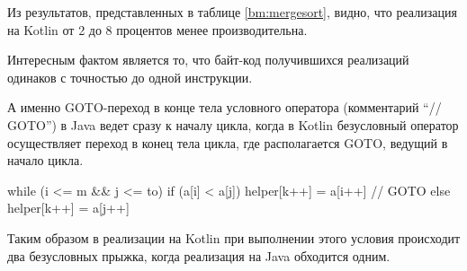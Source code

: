 Из результатов, представленных в таблице \ref{bm:mergesort}, видно, что реализация на Kotlin от 2
до 8 процентов менее производительна.

Интересным фактом является то, что байт-код получившихся реализаций одинаков с точностью до одной
инструкции.

А именно GOTO-переход в конце тела условного оператора (комментарий ``// GOTO'') в Java ведет
сразу к началу цикла, когда в Kotlin безусловный оператор осуществляет переход в конец тела цикла,
где располагается GOTO, ведущий в начало цикла.

\begin{pyglist}[language=kotlin]
    while (i <= m && j <= to) {
        if (a[i] < a[j]) {
            helper[k++] = a[i++] // GOTO
        } else {
            helper[k++] = a[j++]
        }
    }
\end{pyglist}

Таким образом в реализации на Kotlin при выполнении этого условия происходит два безусловных
прыжка, когда реализация на Java обходится одним.
